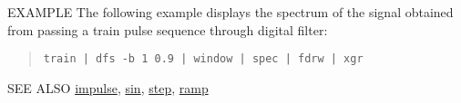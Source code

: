 \begin{options}
\end{options}

\begin{qsection}{EXAMPLE}
The following example displays the spectrum of
the signal obtained from passing a train pulse sequence through
digital filter:
\begin{quote}
\verb!train | dfs -b 1 0.9 | window | spec | fdrw | xgr!
\end{quote}
\end{qsection}

\begin{qsection}{SEE ALSO}
\hyperlink{impulse}{impulse},
\hyperlink{sin}{sin},
\hyperlink{step}{step},
\hyperlink{ramp}{ramp}
\end{qsection}


